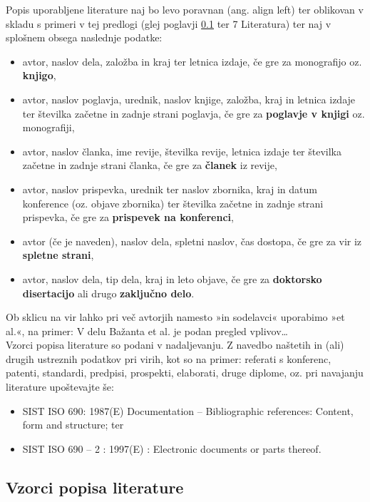 Popis uporabljene literature naj bo levo poravnan (ang. align left) ter oblikovan v skladu s primeri v tej predlogi (glej poglavji \ref{sec:vzorci_lit}  ter 7 Literatura) ter naj v splošnem obsega naslednje podatke:
\begin{itemize}
\item avtor, naslov dela, založba in kraj ter letnica izdaje, če gre za monografijo oz. \textbf{knjigo},
\item avtor, naslov poglavja, urednik, naslov knjige, založba, kraj in letnica izdaje ter številka začetne in zadnje strani poglavja, če gre za \textbf{poglavje v knjigi} oz. monografiji,
\item avtor, naslov članka, ime revije, številka revije, letnica izdaje ter številka začetne in zadnje strani članka, če gre za \textbf{članek} iz revije,
\item avtor, naslov prispevka, urednik ter naslov zbornika, kraj in datum konference (oz. objave zbornika) ter številka začetne in zadnje strani prispevka, če gre za \textbf{prispevek na konferenci},
\item avtor (če je naveden), naslov dela, spletni naslov, čas dostopa, če gre za vir iz \textbf{spletne strani},
\item avtor, naslov dela, tip dela, kraj in leto objave, če gre za \textbf{doktorsko disertacijo} ali drugo \textbf{zaključno delo}.
\end{itemize}

Ob sklicu na vir lahko pri več avtorjih namesto »in sodelavci« uporabimo »et al.«, na primer: V delu Bažanta et al. \cite{bazant_1991} je podan pregled vplivov\ldots\\

Vzorci popisa literature so podani v nadaljevanju. Z navedbo naštetih in (ali) drugih ustreznih podatkov pri virih, kot so na primer: referati s konferenc, patenti, standardi, predpisi, prospekti, elaborati, druge diplome, oz. pri navajanju literature upoštevajte še:
\begin{itemize}
\item SIST ISO 690: 1987(E) Documentation – Bibliographic references: Content, form and structure; ter
\item SIST ISO 690 – 2 : 1997(E) : Electronic documents or parts thereof.
\end{itemize}


\subsection{Vzorci popisa literature}\label{sec:vzorci_lit}

